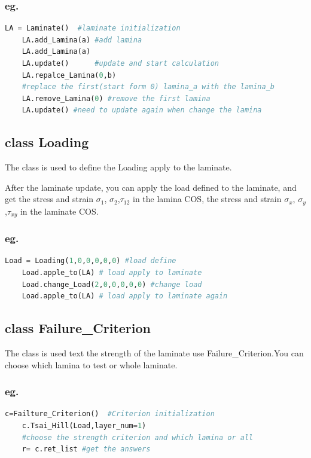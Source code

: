 \documentclass{article}
\begin{document}
		\subsubsection{eg.}	
		\begin{lstlisting}[language={Python}] 
	LA = Laminate()  #laminate initialization
	LA.add_Lamina(a) #add lamina
	LA.add_Lamina(a)
	LA.update()      #update and start calculation
	LA.repalce_Lamina(0,b)
	#replace the first(start form 0) lamina_a with the lamina_b
	LA.remove_Lamina(0) #remove the first lamina
	LA.update() #need to update again when change the lamina
		\end{lstlisting} 

	\subsection{class Loading}
		The class is used to define the Loading apply to the laminate.

		After the laminate update, you can apply the load defined to the laminate, and get the stress and strain $\sigma_1$, $\sigma_2$,$\tau_{12}$ in the lamina COS, the stress and strain $\sigma_x$, $\sigma_y$,$\tau_{xy}$ in the laminate COS.

		\subsubsection{eg.}	
		\begin{lstlisting}[language={Python}] 
	Load = Loading(1,0,0,0,0,0) #load define
	Load.apple_to(LA) # load apply to laminate
	Load.change_Load(2,0,0,0,0,0) #change load
	Load.apple_to(LA) # load apply to laminate again
		\end{lstlisting}

	\subsection{class Failure\_Criterion}
		The class is used text the strength of the laminate use Failure\_Criterion.You can choose which lamina to test or whole laminate. 

		\subsubsection{eg.}	
		\begin{lstlisting}[language={Python}] 
	c=Failture_Criterion()  #Criterion initialization
	c.Tsai_Hill(Load,layer_num=1) 
	#choose the strength criterion and which lamina or all
	r= c.ret_list #get the answers
		\end{lstlisting}
		 	
\end{document}
